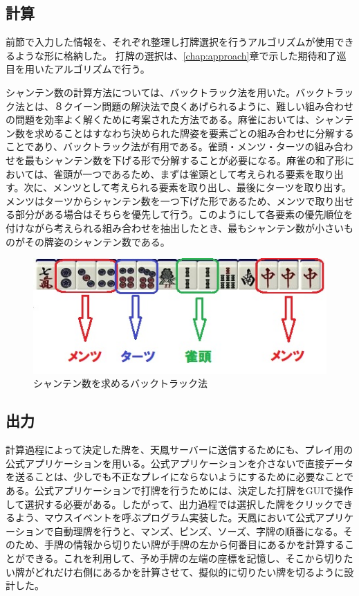 \subsection{計算}
前節で入力した情報を、それぞれ整理し打牌選択を行うアルゴリズムが使用できるような形に格納した。
打牌の選択は、\ref{chap:approach}章で示した期待和了巡目を用いたアルゴリズムで行う。


シャンテン数の計算方法については、バックトラック法を用いた。バックトラック法とは、８クイーン問題の解決法で良くあげられるように、難しい組み合わせの問題を効率よく解くために考案された方法である。麻雀においては、シャンテン数を求めることはすなわち決められた牌姿を要素ごとの組み合わせに分解することであり、バックトラック法が有用である。雀頭・メンツ・ターツの組み合わせを最もシャンテン数を下げる形で分解することが必要になる。麻雀の和了形においては、雀頭が一つであるため、まずは雀頭として考えられる要素を取り出す。次に、メンツとして考えられる要素を取り出し、最後にターツを取り出す。メンツはターツからシャンテン数を一つ下げた形であるため、メンツで取り出せる部分がある場合はそちらを優先して行う。このようにして各要素の優先順位を付けながら考えられる組み合わせを抽出したとき、最もシャンテン数が小さいものがその牌姿のシャンテン数である。

\begin{figure}[h]
 \centering
 \includegraphics[keepaspectratio, scale=1,bb=0 0 320 220]
      {img/back.jpg}
 \caption{シャンテン数を求めるバックトラック法}
 \label{zu}
\end{figure}

\subsection{出力}
計算過程によって決定した牌を、天鳳サーバーに送信するためにも、プレイ用の公式アプリケーションを用いる。公式アプリケーションを介さないで直接データを送ることは、少しでも不正なプレイにならないようにするために必要なことである。公式アプリケーションで打牌を行うためには、決定した打牌をGUIで操作して選択する必要がある。したがって、出力過程では選択した牌をクリックできるよう、マウスイベントを呼ぶプログラム実装した。天鳳において公式アプリケーションで自動理牌を行うと、マンズ、ピンズ、ソーズ、字牌の順番になる。そのため、手牌の情報から切りたい牌が手牌の左から何番目にあるかを計算することができる。これを利用して、予め手牌の左端の座標を記憶し、そこから切りたい牌がどれだけ右側にあるかを計算させて、擬似的に切りたい牌を切るように設計した。


